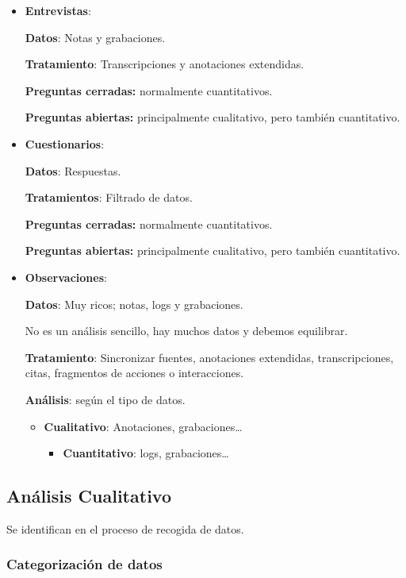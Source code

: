 \begin{itemize}
\item
  \textbf{Entrevistas}:

  \textbf{Datos}: Notas y grabaciones.

  \textbf{Tratamiento}: Transcripciones y anotaciones extendidas.

  \textbf{Preguntas cerradas:} normalmente cuantitativos.

  \textbf{Preguntas abiertas:} principalmente cualitativo, pero también
  cuantitativo.
\item
  \textbf{Cuestionarios}:

  \textbf{Datos}: Respuestas.

  \textbf{Tratamientos}: Filtrado de datos.

  \textbf{Preguntas cerradas:} normalmente cuantitativos.

  \textbf{Preguntas abiertas:} principalmente cualitativo, pero también
  cuantitativo.
\item
  \textbf{Observaciones}:

  \textbf{Datos}: Muy ricos; notas, logs y grabaciones.

  No es un análisis sencillo, hay muchos datos y debemos equilibrar.

  \textbf{Tratamiento}: Sincronizar fuentes, anotaciones extendidas,
  transcripciones, citas, fragmentos de acciones o interacciones.

  \textbf{Análisis}: según el tipo de datos.

  \begin{itemize}
  \tightlist
  \item
    \textbf{Cualitativo}: Anotaciones, grabaciones\ldots{}

    \begin{itemize}
    \tightlist
    \item
      \textbf{Cuantitativo}: logs, grabaciones\ldots{}
    \end{itemize}
  \end{itemize}
\end{itemize}

\hypertarget{anuxe1lisis-cualitativo}{%
\subsection{Análisis Cualitativo}\label{anuxe1lisis-cualitativo}}

Se identifican en el proceso de recogida de datos.

\hypertarget{categorizaciuxf3n-de-datos}{%
\subsubsection{Categorización de
datos}\label{categorizaciuxf3n-de-datos}}

